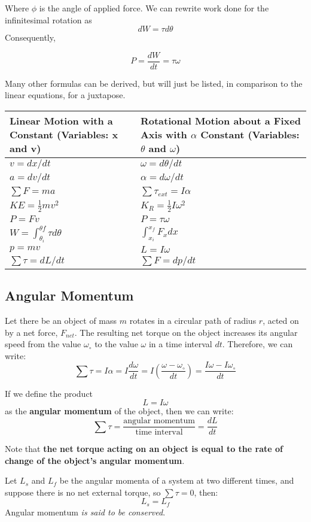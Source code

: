 Where $\phi$ is the angle of applied force. We can rewrite work done for the infinitesimal rotation as 
$$dW = \tau d\theta$$
Consequently,

$$P = \frac{dW}{dt} = \tau \omega$$

Many other formulas can be derived, but will just be listed, in comparison to the linear equations, for a juxtapose.

\begin{tabular}{p{} p{}} \toprule 
Linear Motion with a Constant (Variables: x and v) & Rotational Motion about a Fixed Axis with $\alpha$ Constant (Variables: $\theta$ and $\omega$)\\ \midrule
$v=dx/dt$ & $\omega=d\theta/dt$\\
$a = dv/dt$ & $\alpha = d\omega/dt$ \\
 $\sum F = ma$ & $\sum \tau_{ext}=I \alpha$\\
$KE = \frac{1}{2}mv^2$ & $K_R =\frac{1}{2} I \omega ^2$\\
$P = Fv$ & $P = \tau \omega $\\
$W = \int_{\theta_i}^{\theta f} \tau d\theta$ & $\int_{x_i}^{x_f} F_x dx$ \\
$p=mv$ & $L = I \omega $\\
$\sum \tau= dL/dt $ & $\sum F = dp/dt$ \\\bottomrule
\end{tabular}

\subsection{Angular Momentum}
Let there be an object of mass $m$ rotates in a circular path of radius $r$, acted on by a net force, $F_{net}$. The resulting net torque on the object increases its angular speed from the value $\omega_\circ$ to the value $\omega$ in a time interval $d t$. Therefore, we can write:
$$\sum{\tau} = I\alpha = I \frac{d \omega}{d t} = I\left(\frac{\omega - \omega_\circ}{d t}\right) = \frac{I\omega - I\omega_\circ}{d t}$$

If we define the product
$$L=I\omega$$
as the \textbf{angular momentum} of the object, then we can write:
$$\sum{\tau}=\frac{\text{angular momentum}}{\text{time interval}} = \frac{d L}{d t}$$

Note that \textbf{the net torque acting on an object is equal to the rate of change of the object's angular momentum}.

\begin{form}
Let $L_s$ and $L_f$ be the angular momenta of a system at two different times, and suppose there is no net external torque, so $\sum{\tau} = 0$, then:
$$L_s = L_f$$
Angular momentum \emph{is said to be conserved}.
\end{form}


